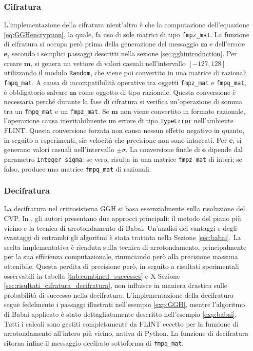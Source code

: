\subsubsection{Cifratura}

L'implementazione della cifratura nient'altro è che la computazione dell'equazione 
\ref{eq:GGHencryption}, la quale, fa uso di sole matrici di tipo \texttt{fmpz\_mat}.
La funzione di cifratura si occupa però prima della generazione del messaggio $\mathbf{m}$ 
e dell'errore $\mathbf{e}$, secondo i semplici passaggi descritti nella sezione 
\ref{sec:gghintroduction}. 
Per creare $\mathbf{m}$, si genera un vettore di valori casuali nell'intervallo 
$[-127, 128]$ utilizzando il modulo \texttt{Random}, che viene poi convertito in 
una matrice di razionali \texttt{fmpq\_mat}. 
A causa di incompatibilità operative tra oggetti \texttt{fmpz\_mat} e \texttt{fmpq\_mat}, è
obbligatorio salvare $\mathbf{m}$ come oggetto di tipo razionale. Questa conversione 
è necessaria perché durante la fase di cifratura si verifica un'operazione di somma 
tra un \texttt{fmpq\_mat} e un \texttt{fmpz\_mat}. Se $\mathbf{m}$ non viene convertito 
in formato razionale, l'operazione causa inevitabilmente un errore di tipo 
\texttt{TypeError} nell'ambiente FLINT. Questa conversione forzata non causa nessun effetto
negativo in quanto, in seguito a esperimenti, sia velocità che precisione non sono intaccati.  
Per $\mathbf{e}$, si generano valori 
casuali nell'intervallo $\pm \sigma$. La conversione finale di $\mathbf{e}$ dipende 
dal parametro \texttt{integer\_sigma}: se vero, risulta in una matrice \texttt{fmpz\_mat} 
di interi; se falso, produce una matrice \texttt{fmpq\_mat} di razionali. 

\subsubsection{Decifratura}

La decifratura nel crittosistema GGH si basa essenzialmente sulla risoluzione del CVP. 
In \cite{GGH97}, gli autori presentano due approcci principali: il metodo del piano più 
vicino e la tecnica di arrotondamento di Babai. Un'analisi dei vantaggi e 
degli svantaggi di entrambi gli algoritmi è stata trattata nella Sezione \ref{sec:babai}. 
La scelta implementativa è ricaduta sulla tecnica di arrotondamento, principalmente per la sua 
efficienza computazionale, rinunciando però alla precisione massima ottenibile. Questa perdita
di precisione però, in seguito a risultati sperimentali osservabili 
in tabella \ref{tab:combined_successes} e X Sezione \ref{sec:risultati_cifratura_decifratura},
non influisce in maniera drastica sulle probabilità di successo nella decifratura.  
L'implementazione della decifratura segue fedelmente i passaggi illustrati nell'esempio 
\ref{exp:GGH}, mentre l'algoritmo di Babai applicato è stato dettagliatamente descritto 
nell'esempio \ref{exp:babai}. Tutti i calcoli sono gestiti completamente da FLINT eccetto
per la funzione di arrotondamento all'intero più vicino, nativa di Python. La funzione di 
decifratura ritorna infine il messaggio decifrato sottoforma di \texttt{fmpq\_mat}. 

